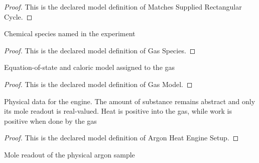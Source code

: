 \begin{proof}
  This is the declared model definition of Matches Supplied Rectangular Cycle.
\end{proof}
\begin{definition}
  \label{def:physics:phyx-mini-0354:phyxminiproblems-problemphyxmini0354-gasspecies}
  Chemical species named in the experiment
\end{definition}
\begin{proof}
  This is the declared model definition of Gas Species.
\end{proof}
\begin{definition}
  \label{def:physics:phyx-mini-0354:phyxminiproblems-problemphyxmini0354-gasmodel}
  Equation-of-state and caloric model assigned to the gas
\end{definition}
\begin{proof}
  This is the declared model definition of Gas Model.
\end{proof}
\begin{definition}
  \label{def:physics:phyx-mini-0354:phyxminiproblems-problemphyxmini0354-argonheatenginesetup}
  Physical data for the engine. The amount of substance remains abstract and only its mole readout is real-valued. Heat is positive into the gas, while work is positive when done by the gas
\end{definition}
\begin{proof}
  This is the declared model definition of Argon Heat Engine Setup.
\end{proof}
\begin{definition}
  \label{def:physics:phyx-mini-0354:phyxminiproblems-problemphyxmini0354-moleamountofgas}
  Mole readout of the physical argon sample
\end{definition}
